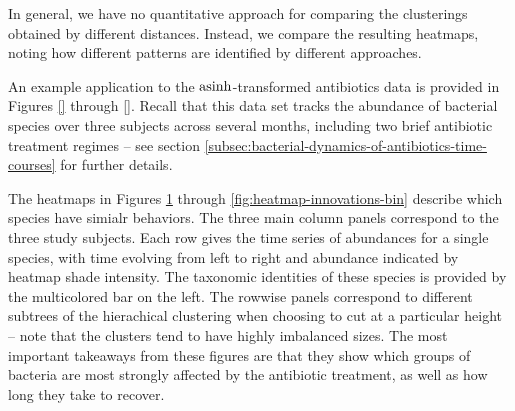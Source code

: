 \documentclass{article}
\begin{document}
In general, we have no quantitative approach for comparing the clusterings
obtained by different distances. Instead, we compare the resulting heatmaps,
noting how different patterns are identified by different approaches.

An example application to the $\mathop\mathrm{asinh}$-transformed antibiotics data is provided
in Figures \ref{} through \ref{}. Recall that this data set tracks the abundance
of bacterial species over three subjects across several months, including two
brief antibiotic treatment regimes -- see section
\ref{subsec:bacterial-dynamics-of-antibiotics-time-courses} for further details.


The heatmaps in Figures \ref{fig:heatmap-euclidean} through
\ref{fig:heatmap-innovations-bin} describe which species have simialr behaviors.
The three main column panels correspond to the three study subjects. Each row
gives the time series of abundances for a single species, with time evolving
from left to right and abundance indicated by heatmap shade intensity. The
taxonomic identities of these species is provided by the multicolored bar on the
left. The rowwise panels correspond to different subtrees of the hierachical
clustering when choosing to cut at a particular height -- note that the clusters
tend to have highly imbalanced sizes. The most important takeaways from these
figures are that they show which groups of bacteria are most strongly affected
by the antibiotic treatment, as well as how long they take to recover.

\begin{figure}[ht]
  \centering
  \caption{\label{fig:heatmap-euclidean} }
\end{figure}

\begin{figure}[ht]
  \centering
  \caption{\label{fig:heatmap-jaccard} }
\end{figure}

\begin{figure}[ht]
  \centering
  \caption{\label{fig:heatmap-mix} }
\end{figure}

\begin{figure}[ht]
  \centering
  \caption{\label{fig:heatmap-innovations} }
\end{figure}
\end{document}

